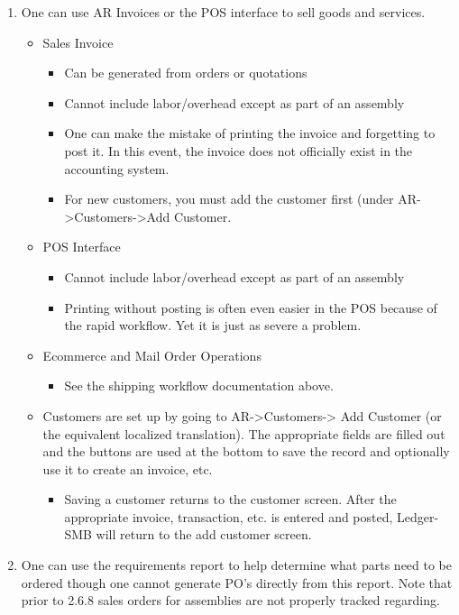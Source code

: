 \documentclass{article}
\begin{document}
\begin{enumerate}
\item One can use AR Invoices or the POS interface to sell goods and services.
  \begin{itemize}
  \item Sales Invoice
    \begin{itemize}
    \item Can be generated from orders or quotations
    \item Cannot include labor/overhead except as part of an assembly
    \item One can make the mistake of printing the invoice and forgetting to
          post it.  In this event, the invoice does not officially exist in the
          accounting system.
    \item For new customers, you must add the customer first (under 
	AR-\textgreater Customers-\textgreater Add Customer.
    \end{itemize}
  \item POS Interface
    \begin{itemize}
    \item Cannot include labor/overhead except as part of an assembly
    \item Printing without posting is often even easier in the POS because of
          the rapid workflow.  Yet it is just as severe a problem.
    \end{itemize}
  \item Ecommerce and Mail Order Operations
    \begin{itemize}
    \item See the shipping workflow documentation above.
    \end{itemize}
  \item Customers are set up by going to AR-\textgreater Customers-\textgreater
	Add Customer (or the
        equivalent localized translation).  The appropriate fields are filled
	out and the buttons are used at the bottom to save the record and
	optionally use it to create an invoice, etc.
    \begin{itemize}
    \item Saving a customer returns to the customer screen.  After the
	appropriate invoice, transaction, etc. is entered and posted, Ledger-SMB
	will return to the add customer screen.
    \end{itemize}
  \end{itemize}
\item One can use the requirements report to help determine what parts need to 
be ordered though one cannot generate PO's directly from this report.  Note that
prior to 2.6.8 sales orders for assemblies are not properly tracked regarding.
\end{enumerate}
\end{document}
